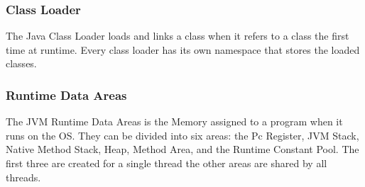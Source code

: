 \subsubsection{Class Loader}
The Java Class Loader loads and links a class when it refers to a class the first time at runtime. Every class loader has its own namespace that stores the loaded classes.\cite{javaJVM} 
\newpage
\subsubsection{Runtime Data Areas}
The JVM Runtime Data Areas is the Memory assigned to a program when it runs on the OS. They can be divided into six areas: the Pc Register, JVM Stack, Native Method Stack, Heap, Method Area, and the Runtime Constant Pool. The first three are created for a single thread the other areas are shared by all threads.  

